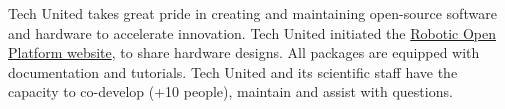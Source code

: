 Tech United takes great pride in creating and maintaining open-source software and hardware to accelerate innovation. Tech United initiated the \href{http://roboticopenplatform.org/}{Robotic Open Platform website}, to share hardware designs. All packages are equipped with documentation and tutorials. Tech United and its scientific staff have the capacity to co-develop (+10 people), maintain and assist with questions. 